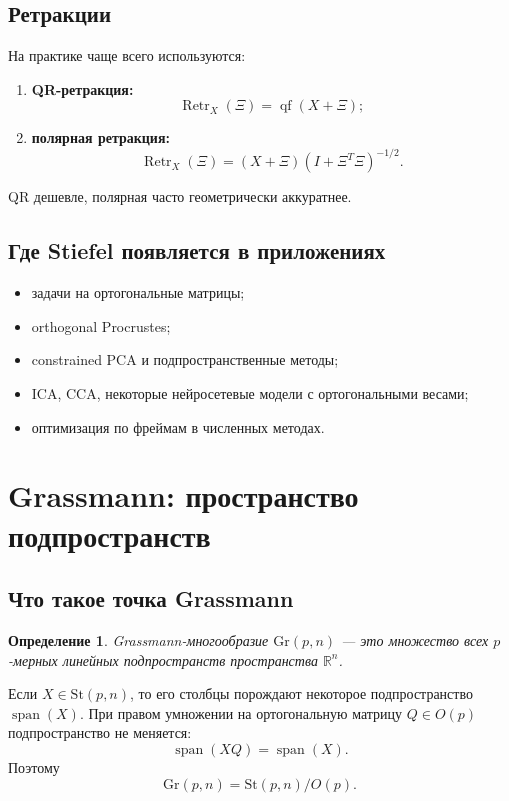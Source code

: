 \documentclass[12pt,a4paper]{article}
\theoremstyle{rudef}
\newtheorem{definition}{Определение}[section]
\theoremstyle{ruplain}
\newcommand{\R}{\mathbb{R}}
\newcommand{\St}{\mathrm{St}}
\newcommand{\Gr}{\mathrm{Gr}}
\newcommand{\Retr}{\operatorname{Retr}}
\begin{document}
\subsection{Ретракции}

На практике чаще всего используются:
\begin{enumerate}
  \item \textbf{QR-ретракция:}
  \[
  \Retr_X(\Xi)=\operatorname{qf}(X+\Xi);
  \]
  \item \textbf{полярная ретракция:}
  \[
  \Retr_X(\Xi)=(X+\Xi)(I+\Xi^T\Xi)^{-1/2}.
  \]
\end{enumerate}

QR дешевле, полярная часто геометрически аккуратнее.

\subsection{Где Stiefel появляется в приложениях}

\begin{itemize}
  \item задачи на ортогональные матрицы;
  \item orthogonal Procrustes;
  \item constrained PCA и подпространственные методы;
  \item ICA, CCA, некоторые нейросетевые модели с ортогональными весами;
  \item оптимизация по фреймам в численных методах.
\end{itemize}

\section{Grassmann: пространство подпространств}

\subsection{Что такое точка Grassmann}

\begin{definition}
Grassmann-многообразие $\Gr(p,n)$ --- это множество всех $p$-мерных линейных подпространств пространства $\R^n$.
\end{definition}

Если $X\in \St(p,n)$, то его столбцы порождают некоторое подпространство $\operatorname{span}(X)$. При правом умножении на ортогональную матрицу $Q\in O(p)$ подпространство не меняется:
\[
\operatorname{span}(XQ)=\operatorname{span}(X).
\]
Поэтому
\[
\Gr(p,n)=\St(p,n)/O(p).
\]
\end{document}
